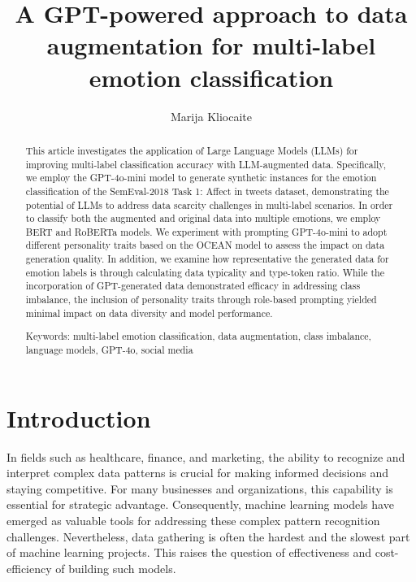 \documentclass[manuscript]{clv3}
\begin{document}
\clearpage
\let\cleardoublepage\clearpage


\title{A GPT-powered approach to data
augmentation for multi-label
emotion classification}

\author{Marija Kliocaite}

\maketitle


\begin{abstract}
This article investigates the application of Large Language Models (LLMs) for improving multi-label classification accuracy with LLM-augmented data. Specifically, we employ the GPT-4o-mini model to generate synthetic instances for the emotion classification of the SemEval-2018 Task 1: Affect in tweets dataset, demonstrating the potential of LLMs to address data scarcity challenges in multi-label scenarios. In order to classify both the augmented and original data into multiple emotions, we employ BERT and RoBERTa models. We experiment with prompting GPT-4o-mini to adopt different personality traits based on the OCEAN model to assess the impact on data generation quality. In addition, we examine how representative the generated data for emotion labels is through calculating data typicality and type-token ratio. While the incorporation of GPT-generated data demonstrated efficacy in addressing class imbalance, the inclusion of personality traits through role-based prompting yielded minimal impact on data diversity and model performance.

Keywords: multi-label emotion classification, data augmentation, class imbalance, language models, GPT-4o, social media
\end{abstract}

\section{Introduction}

In fields such as healthcare, finance, and marketing, the ability to recognize and interpret complex data patterns is crucial for making informed decisions and staying competitive. For many businesses and organizations, this capability is essential for strategic advantage. Consequently, machine learning models have emerged as valuable tools for addressing these complex pattern recognition challenges. Nevertheless, data gathering is often the hardest and the slowest part of machine learning projects. This raises the question of effectiveness and cost-efficiency of building such models.
\end{document}

